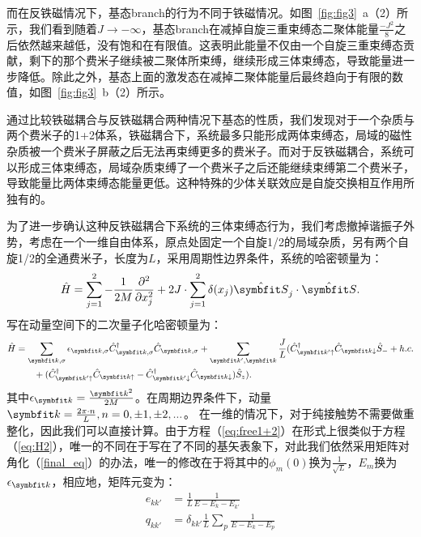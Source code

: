 而在反铁磁情况下，基态branch的行为不同于铁磁情况。如图~\ref{fig:fig3}~a（2）所示，我们看到随着$J\to-\infty$，基态branch在减掉自旋三重束缚态二聚体能量$\frac{-J^2}{8}$之后依然越来越低，没有饱和在有限值。这表明此能量不仅由一个自旋三重束缚态贡献，剩下的那个费米子继续被二聚体所束缚，继续形成三体束缚态，导致能量进一步降低。除此之外，基态上面的激发态在减掉二聚体能量后最终趋向于有限的数值，如图~\ref{fig:fig3}~b（2）所示。

通过比较铁磁耦合与反铁磁耦合两种情况下基态的性质，我们发现对于一个杂质与两个费米子的1+2体系，铁磁耦合下，系统最多只能形成两体束缚态，局域的磁性杂质被一个费米子屏蔽之后无法再束缚更多的费米子。而对于反铁磁耦合，系统可以形成三体束缚态，局域杂质束缚了一个费米子之后还能继续束缚第二个费米子，导致能量比两体束缚态能量更低。这种特殊的少体关联效应是自旋交换相互作用所独有的。

为了进一步确认这种反铁磁耦合下系统的三体束缚态行为，我们考虑撤掉谐振子外势，考虑在一个一维自由体系，原点处固定一个自旋1/2的局域杂质，另有两个自旋1/2的全通费米子，长度为$L$，采用周期性边界条件，系统的哈密顿量为：
\begin{equation}
        \hat{H} = \sum_{j=1}^{2}  -\frac{1}{2M} \frac{\partial^2}{\partial x_{j}^2} + 2J\cdot\sum_{j=1}^2\delta(x_j){\hat{\Vector{S}}}_j\cdot {\hat{\Vector{S}}}.
\end{equation}
写在动量空间下的二次量子化哈密顿量为：
\begin{equation}\label{eq:free1+2}
\begin{split}
        \hat{H} &= \sum_{\Vector{k},\sigma}\epsilon_{\Vector{k},\sigma} \hat{C}^\dagger_{\Vector{k},\sigma} \hat{C}_{\Vector{k},\sigma}  + \sum_{\Vector{k}',\Vector{k}} \frac{J}{L} ( \hat{C}_{\Vector{k}'\uparrow}^\dagger  \hat{C}_{\Vector{k}\downarrow} \hat{S}_- + h.c. \\
        & \quad \quad +   (\hat{C}_{\Vector{k}'\uparrow}^\dagger  \hat{C}_{\Vector{k}\uparrow}-\hat{C}_{\Vector{k}'\downarrow}^\dagger  \hat{C}_{\Vector{k}\downarrow}) \hat{S}_{z} ).
\end{split}
\end{equation}
其中$\epsilon_{\Vector{k}} = \frac{\Vector{k}^2}{2M}$。在周期边界条件下，动量$\Vector{k} = \frac{2\pi\cdot n}{L}, n=0, \pm1, \pm2,...$。
在一维的情况下，对于纯接触势不需要做重整化，因此我们可以直接计算。由于方程（\ref{eq:free1+2}）在形式上很类似于方程（\ref{eq:H2}），唯一的不同在于写在了不同的基矢表象下，对此我们依然采用矩阵对角化（\ref{final_eq}）的办法，唯一的修改在于将其中的$\phi_m(0)$换为$\frac{1}{\sqrt{L}}$，$E_m$换为$\epsilon_{\Vector{k}}$，相应地，矩阵元变为：
\begin{equation}
\begin{split}
e_{kk'} &= \frac{1}{L}\frac{1}{E-E_k-E_{k'}}\\
q_{kk'} &= \delta_{kk'}  \frac{1}{L}\sum_p \frac{1}{E-E_k-E_p}\\
\end{split}
\end{equation}

